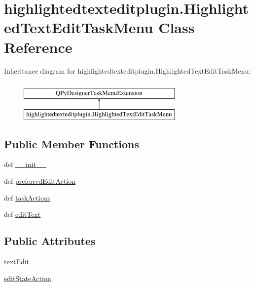 \hypertarget{classhighlightedtexteditplugin_1_1HighlightedTextEditTaskMenu}{}\section{highlightedtexteditplugin.\+Highlighted\+Text\+Edit\+Task\+Menu Class Reference}
\label{classhighlightedtexteditplugin_1_1HighlightedTextEditTaskMenu}
Inheritance diagram for highlightedtexteditplugin.\+Highlighted\+Text\+Edit\+Task\+Menu\+:\begin{figure}[H]
\begin{center}
\leavevmode
\includegraphics[height=2.000000cm]{classhighlightedtexteditplugin_1_1HighlightedTextEditTaskMenu}
\end{center}
\end{figure}
\subsection*{Public Member Functions}
\begin{DoxyCompactItemize}
\item 
def \hyperlink{classhighlightedtexteditplugin_1_1HighlightedTextEditTaskMenu_a9e20802e838216960799f96b69c1742d}{\+\_\+\+\_\+init\+\_\+\+\_\+}
\item 
def \hyperlink{classhighlightedtexteditplugin_1_1HighlightedTextEditTaskMenu_a58fe023aaafe31608dee67c5feca197c}{preferred\+Edit\+Action}
\item 
def \hyperlink{classhighlightedtexteditplugin_1_1HighlightedTextEditTaskMenu_ad5c973f952a1ed3a6ecbde8deef49187}{task\+Actions}
\item 
def \hyperlink{classhighlightedtexteditplugin_1_1HighlightedTextEditTaskMenu_a7e198938f97e7d9fda7137cce0307ad9}{edit\+Text}
\end{DoxyCompactItemize}
\subsection*{Public Attributes}
\begin{DoxyCompactItemize}
\item 
\hyperlink{classhighlightedtexteditplugin_1_1HighlightedTextEditTaskMenu_a744e097b876735070861bab085ccb1cf}{text\+Edit}
\item 
\hyperlink{classhighlightedtexteditplugin_1_1HighlightedTextEditTaskMenu_a5e6eafe31ab1adb066a3f7e91f2e2efa}{edit\+State\+Action}
\end{DoxyCompactItemize}


